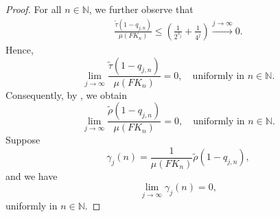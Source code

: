 \documentclass[11pt]{amsart}
\theoremstyle{definition}
\theoremstyle{myremark}
\numberwithin{equation}{section}
\def\N{\mathbb N}
\begin{document}
\begin{proof}
\noindent
For all  $n \in \mathbb{N}$, we further observe that 
\begin{align*} 
	\frac{\widetilde{\tau}(1-q_{j,n})}{\mu(FK_n)} \leq \left( \frac{1 }{2^{s_j}} + \frac{1}{4^j}\right) \xrightarrow{ j \to \infty } 0.
\end{align*}
Hence,
\begin{equation*}
	\lim_{j \to \infty} \frac{\widetilde{\tau}(1-q_{j,n})}{\mu(FK_n)}= 0, \quad \text{uniformly in }  n \in \mathbb{N}.
\end{equation*}
Consequently, by , we obtain
\begin{equation*}
	\lim_{j \to \infty} \frac{\widetilde{\rho}(1-q_{j,n})}{\mu(FK_n)} =0, \quad \text{uniformly in }  n \in \mathbb{N}.
\end{equation*}
Suppose 
\[
\gamma_j(n) = \frac{1}{\mu(FK_n)} \widetilde{\rho} \left( 1-q_{j, n} \right),
\]
and we have 
\[
\lim_{ j \to \infty } \gamma_j(n) = 0,
\]
uniformly in $n \in \N$.





\end{proof}
\end{document}
